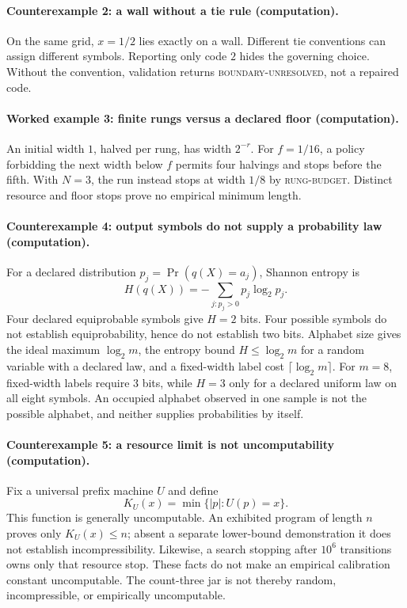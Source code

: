 \paragraph{Counterexample 2: a wall without a tie rule (computation).}
On the same grid, \(x=1/2\) lies exactly on a wall.  Different tie conventions can assign different symbols.
Reporting only code \(2\) hides the governing choice.  Without the convention, validation returns
\textsc{boundary-unresolved}, not a repaired code.

\paragraph{Worked example 3: finite rungs versus a declared floor (computation).}
An initial width \(1\), halved per rung, has width \(2^{-r}\).  For \(f=1/16\), a policy forbidding the next width
below \(f\) permits four halvings and stops before the fifth.  With \(N=3\), the run instead stops at width \(1/8\) by
\textsc{rung-budget}.  Distinct resource and floor stops prove no empirical minimum length.

\paragraph{Counterexample 4: output symbols do not supply a probability law (computation).}
For a declared distribution \(p_j=\Pr(q(X)=a_j)\), Shannon entropy is
\[
                         H(q(X))=-\sum_{j:p_j>0}p_j\log_2p_j.
\]
Four declared equiprobable symbols give \(H=2\) bits.  Four possible symbols do not establish equiprobability, hence
do not establish two bits.  Alphabet size gives the ideal maximum \(\log_2m\), the entropy bound
\(H\leq\log_2m\) for a random variable with a declared law, and a fixed-width label cost
\(\lceil\log_2m\rceil\).  For \(m=8\), fixed-width labels require \(3\) bits, while \(H=3\) only for a declared uniform
law on all eight symbols.  An occupied alphabet observed in one sample is not the possible alphabet, and neither
supplies probabilities by itself.

\paragraph{Counterexample 5: a resource limit is not uncomputability (computation).}
Fix a universal prefix machine \(U\) and define
\[
                         K_U(x)=\min\{|p|:U(p)=x\}.
\]
This function is generally uncomputable.  An exhibited program of length \(n\) proves only \(K_U(x)\leq n\); absent a
separate lower-bound demonstration it does not establish incompressibility.  Likewise, a search stopping after \(10^6\)
transitions owns only that resource stop.  These facts do not make an empirical calibration constant uncomputable.
The count-three jar is not thereby random, incompressible, or empirically uncomputable.

